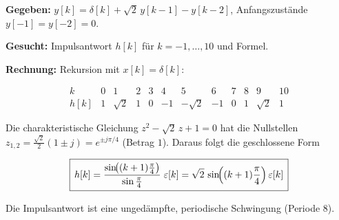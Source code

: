 \begin{beispiel}[6.2b) Impulsantwort]

\textbf{Gegeben:} $y[k]=\delta[k]+\sqrt{2}\,y[k-1]-y[k-2]$, Anfangszustände
$y[-1]=y[-2]=0$.

\textbf{Gesucht:} Impulsantwort $h[k]$ für $k=-1,\dots,10$ und Formel.

\textbf{Rechnung:} Rekursion mit $x[k]=\delta[k]$:

$$
\begin{array}{c|ccccccccccc}
k    & 0 & 1        & 2 & 3 & 4  & 5         & 6  & 7 & 8 & 9        & 10 \\\hline
h[k] & 1 & \sqrt{2} & 1 & 0 & -1 & -\sqrt{2} & -1 & 0 & 1 & \sqrt{2} & 1
\end{array}
$$

Die charakteristische Gleichung $z^2-\sqrt{2}\,z+1=0$ hat die Nullstellen
$z_{1,2}=\tfrac{\sqrt2}{2}(1\pm j)=e^{\pm j\pi/4}$ (Betrag $1$). Daraus folgt
die geschlossene Form

$$
\boxed{\,h[k] = \frac{\sin\!\bigl((k+1)\tfrac{\pi}{4}\bigr)}{\sin\tfrac{\pi}{4}}\;\varepsilon[k]
             = \sqrt{2}\,\sin\!\Bigl((k+1)\frac{\pi}{4}\Bigr)\,\varepsilon[k]\,}
$$

Die Impulsantwort ist eine ungedämpfte, periodische Schwingung
(Periode $8$).

\begin{center}
\end{center}

\end{beispiel}

